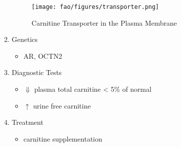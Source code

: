 \documentclass{scrartcl}
\begin{document}
\begin{enumerate}
\begin{figure}[htbp]
\centering
\texttt{[image: fao/figures/transporter.png]}
\caption{\label{fig:org1749b12}Carnitine Transporter in the Plasma Membrane}
\end{figure}

\item Genetics
\label{sec:orgde813cb}
\begin{itemize}
\item AR, OCTN2
\end{itemize}
\item Diagnostic Tests
\label{sec:orgc5fa947}
\begin{itemize}
\item \(\Downarrow\) plasma total carnitine \textless{} 5\% of normal
\item \(\uparrow\) urine free carnitine
\end{itemize}
\item Treatment
\label{sec:orgf795b01}
\begin{itemize}
\item carnitine supplementation
\end{itemize}
\end{enumerate}
\end{document}
